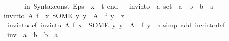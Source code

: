 \begin{isabellebody}
\ \ \ \ \ \ in\ Syntax{\isachardot}{\kern0pt}const\ \isactrlsyntaxUNDERSCOREconst {\isasymopen}{\isacharunderscore}{\kern0pt}Eps{\isasymclose}\ {\isachardollar}{\kern0pt}\ x\ {\isachardollar}{\kern0pt}\ t\ end{\isacharparenright}{\kern0pt}{\isacharbrackright}{\kern0pt}\isanewline
{\isacartoucheclose}\ %
%
\endisatagML
{\isafoldML}%
%
\isadelimML
\isanewline
%
\endisadelimML
\isanewline
{}\isamarkupfalse%
\ inv{\isacharunderscore}{\kern0pt}into\ {\isacharcolon}{\kern0pt}{\isacharcolon}{\kern0pt}\ {\isachardoublequoteopen}{\isacharprime}{\kern0pt}a\ set\ {\isasymRightarrow}\ {\isacharparenleft}{\kern0pt}{\isacharprime}{\kern0pt}a\ {\isasymRightarrow}\ {\isacharprime}{\kern0pt}b{\isacharparenright}{\kern0pt}\ {\isasymRightarrow}\ {\isacharparenleft}{\kern0pt}{\isacharprime}{\kern0pt}b\ {\isasymRightarrow}\ {\isacharprime}{\kern0pt}a{\isacharparenright}{\kern0pt}{\isachardoublequoteclose}\ \isanewline
{\isachardoublequoteopen}inv{\isacharunderscore}{\kern0pt}into\ A\ f\ {\isacharequal}{\kern0pt}\ {\isacharparenleft}{\kern0pt}{\isasymlambda}x{\isachardot}{\kern0pt}\ SOME\ y{\isachardot}{\kern0pt}\ y\ {\isasymin}\ A\ {\isasymand}\ f\ y\ {\isacharequal}{\kern0pt}\ x{\isacharparenright}{\kern0pt}{\isachardoublequoteclose}\isanewline
\isanewline
{}\isamarkupfalse%
\ inv{\isacharunderscore}{\kern0pt}into{\isacharunderscore}{\kern0pt}def{}{\isacharcolon}{\kern0pt}\ {\isachardoublequoteopen}inv{\isacharunderscore}{\kern0pt}into\ A\ f\ x\ {\isacharequal}{\kern0pt}\ {\isacharparenleft}{\kern0pt}SOME\ y{\isachardot}{\kern0pt}\ y\ {\isasymin}\ A\ {\isasymand}\ f\ y\ {\isacharequal}{\kern0pt}\ x{\isacharparenright}{\kern0pt}{\isachardoublequoteclose}\isanewline
%
\isadelimproof
%
\endisadelimproof
%
\isatagproof
{}\isamarkupfalse%
{\isacharparenleft}{\kern0pt}simp\ add{\isacharcolon}{\kern0pt}\ inv{\isacharunderscore}{\kern0pt}into{\isacharunderscore}{\kern0pt}def{\isacharparenright}{\kern0pt}%
\endisatagproof
{\isafoldproof}%
%
\isadelimproof
\isanewline
%
\endisadelimproof
\isanewline
{}\isamarkupfalse%
\ inv\ {\isacharcolon}{\kern0pt}{\isacharcolon}{\kern0pt}\ {\isachardoublequoteopen}{\isacharparenleft}{\kern0pt}{\isacharprime}{\kern0pt}a\ {\isasymRightarrow}\ {\isacharprime}{\kern0pt}b{\isacharparenright}{\kern0pt}\ {\isasymRightarrow}\ {\isacharparenleft}{\kern0pt}{\isacharprime}{\kern0pt}b\ {\isasymRightarrow}\ {\isacharprime}{\kern0pt}a{\isacharparenright}{\kern0pt}{\isachardoublequoteclose}\ \isanewline

\end{isabellebody}
